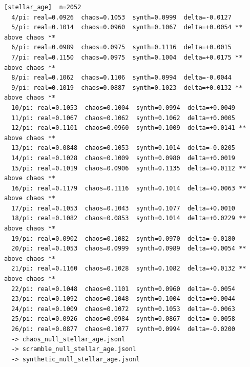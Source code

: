 \documentclass[11pt, letterpaper, openany]{book}
\begin{document}
\begin{empiricalbox}
\begin{lstlisting}[style=terminal]
[stellar_age]  n=2052
  4/pi: real=0.0926  chaos=0.1053  synth=0.0999  delta=-0.0127
  5/pi: real=0.1014  chaos=0.0960  synth=0.1067  delta=+0.0054 ** above chaos **
  6/pi: real=0.0989  chaos=0.0975  synth=0.1116  delta=+0.0015
  7/pi: real=0.1150  chaos=0.0975  synth=0.1004  delta=+0.0175 ** above chaos **
  8/pi: real=0.1062  chaos=0.1106  synth=0.0994  delta=-0.0044
  9/pi: real=0.1019  chaos=0.0887  synth=0.1023  delta=+0.0132 ** above chaos **
  10/pi: real=0.1053  chaos=0.1004  synth=0.0994  delta=+0.0049
  11/pi: real=0.1067  chaos=0.1062  synth=0.1062  delta=+0.0005
  12/pi: real=0.1101  chaos=0.0960  synth=0.1009  delta=+0.0141 ** above chaos **
  13/pi: real=0.0848  chaos=0.1053  synth=0.1014  delta=-0.0205
  14/pi: real=0.1028  chaos=0.1009  synth=0.0980  delta=+0.0019
  15/pi: real=0.1019  chaos=0.0906  synth=0.1135  delta=+0.0112 ** above chaos **
  16/pi: real=0.1179  chaos=0.1116  synth=0.1014  delta=+0.0063 ** above chaos **
  17/pi: real=0.1053  chaos=0.1043  synth=0.1077  delta=+0.0010
  18/pi: real=0.1082  chaos=0.0853  synth=0.1014  delta=+0.0229 ** above chaos **
  19/pi: real=0.0902  chaos=0.1082  synth=0.0970  delta=-0.0180
  20/pi: real=0.1053  chaos=0.0999  synth=0.0989  delta=+0.0054 ** above chaos **
  21/pi: real=0.1160  chaos=0.1028  synth=0.1082  delta=+0.0132 ** above chaos **
  22/pi: real=0.1048  chaos=0.1101  synth=0.0960  delta=-0.0054
  23/pi: real=0.1092  chaos=0.1048  synth=0.1004  delta=+0.0044
  24/pi: real=0.1009  chaos=0.1072  synth=0.1053  delta=-0.0063
  25/pi: real=0.0926  chaos=0.0984  synth=0.0867  delta=-0.0058
  26/pi: real=0.0877  chaos=0.1077  synth=0.0994  delta=-0.0200
  -> chaos_null_stellar_age.jsonl
  -> scramble_null_stellar_age.jsonl
  -> synthetic_null_stellar_age.jsonl


\end{lstlisting}
\end{empiricalbox}
\end{document}
